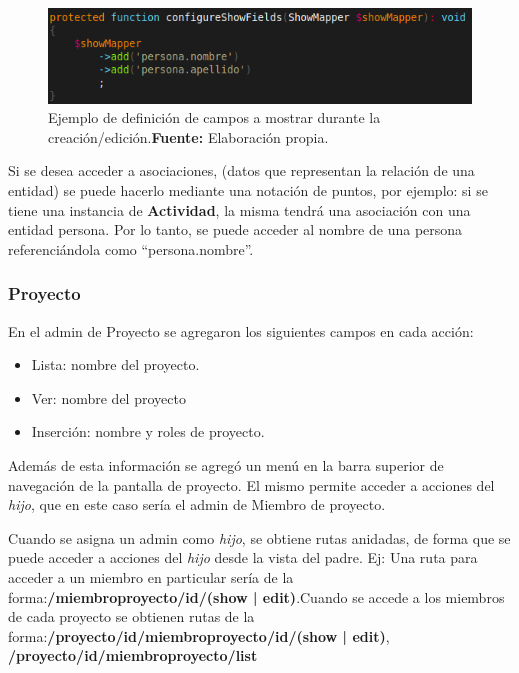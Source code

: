 \begin{figure}[h]
    \includegraphics[width=1\linewidth]{image/show.png}
    \caption{Ejemplo de definición de campos a mostrar durante la creación/edición.\newline \textbf{Fuente:} Elaboración propia.}
    \label{fig:image/show}
\end{figure}

Si se desea acceder a asociaciones, (datos que representan la relación de una entidad) se puede hacerlo mediante una notación de puntos, por ejemplo:
si se tiene una instancia de \textbf{Actividad}, la misma tendrá una asociación con una entidad persona\@. Por lo tanto, se puede acceder al nombre de una
persona referenciándola como ``persona.nombre''.

\subsubsection{Proyecto}%
\label{ssub:admin_proyectadmin_proyecto}

En el admin de Proyecto se agregaron los siguientes campos en cada acción:

\begin{itemize}
    \item Lista: nombre del proyecto.
    \item Ver: nombre del proyecto
    \item Inserción: nombre y roles de proyecto.
\end{itemize}

Además de esta información se agregó un menú en la barra superior de navegación de la pantalla de proyecto. El mismo permite acceder a acciones del \textit{hijo},
que en este caso sería el admin de Miembro de proyecto.

Cuando se asigna un admin como \textit{hijo}, se obtiene rutas anidadas, de forma que se puede acceder a acciones del \textit{hijo} desde la vista del padre. Ej: Una ruta
para acceder a un miembro en particular sería de la forma:\newline \textbf{/miembroproyecto/{id}/(show | edit)}\@.\newline\newline Cuando se accede a los
miembros de cada proyecto se obtienen rutas de la forma:\newline \textbf{/proyecto/{id}/miembroproyecto/{id}/(show | edit)},
\newline \textbf{/proyecto/{id}/miembroproyecto/list}\newline

